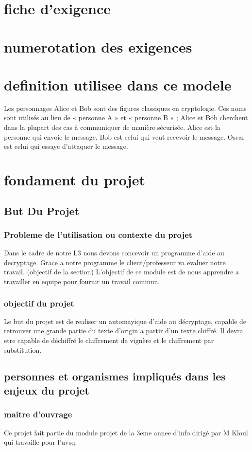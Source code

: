 \documentclass[a4]{article}
\begin{document}
		\section{fiche d'exigence}
		\section{numerotation des exigences}
		\section{definition utilisee dans ce modele}
			Les personnages Alice et Bob sont des figures classiques en cryptologie. Ces noms sont utilisés au lieu de « personne A » et « personne B » ; Alice et Bob cherchent dans la plupart des cas à communiquer de manière sécurisée.
			Alice est la personne qui envoie le message.
			Bob est celui qui veut recevoir le message.
			Oscar est celui qui essaye d'attaquer le message.
	\section{fondament du projet}
		\subsection{But Du Projet} 
			\subsubsection{Probleme de l'utilisation ou contexte du projet}
				Dans le cadre de notre L3 nous devons concevoir un programme d'aide au decryptage.
				Grace a notre programme le client/professeur va evaluer notre travail.
				(objectif de la section)
				L'objectif de ce module est de nous apprendre a travailler en equipe pour fournir un travail commun.
			\subsubsection{objectif du projet}
				Le but du projet est de realiser un automayique d'aide au décryptage, capable de retrouver une grande partie du texte d'origin a partir d'un texte chiffré. Il devra etre capable de déchiffré le chiffrement de vignère et le chiffrement par substitution.
		\subsection{personnes et organismes impliqués dans les enjeux du projet} 
			\subsubsection{maitre d'ouvrage}
				Ce projet fait partie du module projet de la 3eme annee d'info dirigé par M Kloul qui travaille pour l'uvsq.			
\end{document}
